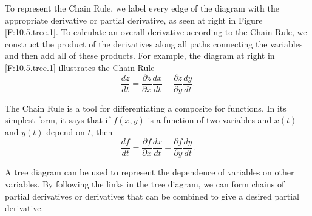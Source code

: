 To represent the Chain Rule, we label every edge of the diagram with the
appropriate derivative or partial derivative, as seen at right in Figure
\ref{F:10.5.tree.1}.  To calculate an overall derivative according to the Chain Rule, we
construct the product of the derivatives along all paths connecting
the variables and then add all of these products.
For example, the
diagram at right in \ref{F:10.5.tree.1} illustrates the Chain Rule
$$
\frac{dz}{dt} = \frac{\partial z}{\partial x}\frac{dx}{dt} +
\frac{\partial z}{\partial y}\frac{dy}{dt}.
$$


%
%





\begin{summary}
\item The Chain Rule is a tool for differentiating a composite for
  functions.  In its simplest form, it says that if $f(x,y)$ is a
  function of two variables and $x(t)$ and $y(t)$ depend on $t$, then
  $$
  \frac{df}{dt} = \frac{\partial f}{\partial x}\frac{dx}{dt}
  + \frac{\partial f}{\partial y}\frac{dy}{dt}.
  $$

\item A tree diagram can be used to represent the dependence of variables on other variables. By following the links in the tree diagram, we can form chains of partial derivatives or derivatives that can be combined to give a desired partial derivative. 
\end{summary}




\nin \hrulefill



\clearpage
